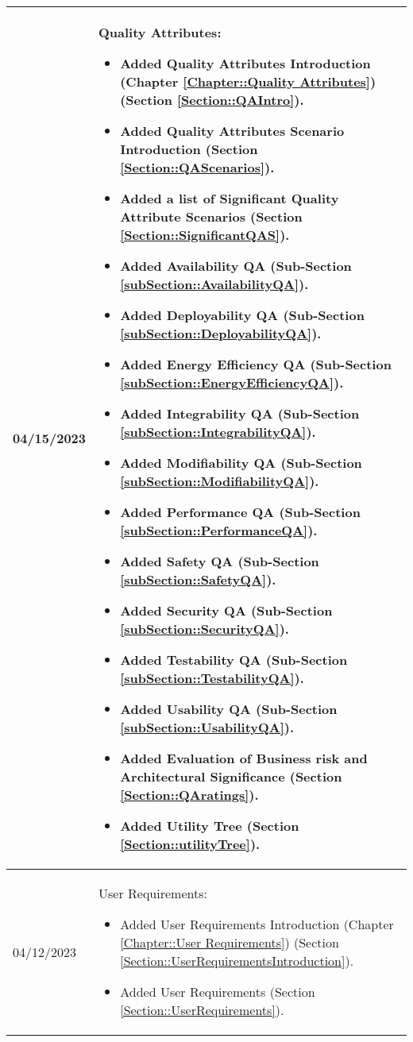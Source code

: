 \begin{longtable}{|l||p{13.5cm}|}
04/15/2023 & Quality Attributes:
\begin{itemize}[topsep=0pt,itemsep=0pt,parsep=0pt,partopsep=0pt,leftmargin=12pt]
\item Added Quality Attributes Introduction (Chapter \ref{Chapter::Quality Attributes}) (Section \ref{Section::QAIntro}). 
\item Added Quality Attributes Scenario Introduction (Section \ref{Section::QAScenarios}). 
\item Added a list of Significant Quality Attribute Scenarios (Section \ref{Section::SignificantQAS}). 
\item Added Availability QA (Sub-Section \ref{subSection::AvailabilityQA}).
\item Added Deployability QA (Sub-Section \ref{subSection::DeployabilityQA}). 
\item Added Energy Efficiency QA (Sub-Section \ref{subSection::EnergyEfficiencyQA}). 
\item Added Integrability QA (Sub-Section \ref{subSection::IntegrabilityQA}). 
\item Added Modifiability QA (Sub-Section \ref{subSection::ModifiabilityQA}). 
\item Added Performance QA (Sub-Section \ref{subSection::PerformanceQA}). 
\item Added Safety QA (Sub-Section \ref{subSection::SafetyQA}). 
\item Added Security QA (Sub-Section \ref{subSection::SecurityQA}). 
\item Added Testability QA (Sub-Section \ref{subSection::TestabilityQA}). 
\item Added Usability QA (Sub-Section \ref{subSection::UsabilityQA}). 
\item Added Evaluation of Business risk and Architectural Significance (Section \ref{Section::QAratings}). 
\item Added Utility Tree (Section \ref{Section::utilityTree}). 



\end{itemize} 
\\ \hline

04/12/2023 & User Requirements:
\begin{itemize}[topsep=0pt,itemsep=0pt,parsep=0pt,partopsep=0pt,leftmargin=12pt]
\item Added User Requirements Introduction (Chapter \ref{Chapter::User Requirements}) (Section \ref{Section::UserRequirementsIntroduction}). 
\item Added User Requirements (Section \ref{Section::UserRequirements}).
\end{itemize} 
\\ \hline


\end{longtable}
